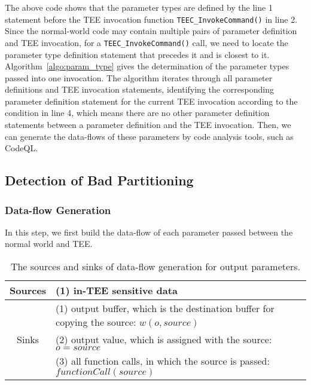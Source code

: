 The above code shows that the parameter types are defined by the line 1 statement before the TEE invocation function \texttt{TEEC\_InvokeCommand()} in line 2.
Since the normal-world code may contain multiple pairs of parameter definition and TEE invocation, for a \texttt{TEEC\_InvokeCommand()} call, we need to locate the parameter type definition statement that precedes it and is closest to it. Algorithm~\ref{algo:param_type} gives the determination of the parameter types passed into one invocation. 
The algorithm iterates through all parameter definitions and TEE invocation statements, identifying the corresponding parameter definition statement for the current TEE invocation according to the condition in line 4, which means there are no other parameter definition statements between a parameter definition and the TEE invocation.
Then, we can generate the data-flows of these parameters by code analysis tools, such as CodeQL.

\subsection{Detection of Bad Partitioning}
\subsubsection{Data-flow Generation} \label{s:dfg}
In this step, we first build the data-flow of each parameter passed between the normal world and TEE.

\begin{table}[t]
    \caption{The sources and sinks of data-flow generation for output parameters.}
    \label{tbl:out_df}
    \centering
	\begin{tabular}{cp{11cm}}
		\toprule
            Sources & (1) in-TEE sensitive data\\
            \midrule
            \multirow{4}{*}{Sinks} & (1) output buffer, which is the destination buffer for copying the source: $w(o,source)$\\
             & (2) output value, which is assigned with the source: $o = source$\\
             & (3) all function calls, in which the source is passed: $functionCall(source)$\\
		\bottomrule
	\end{tabular}
\end{table}

